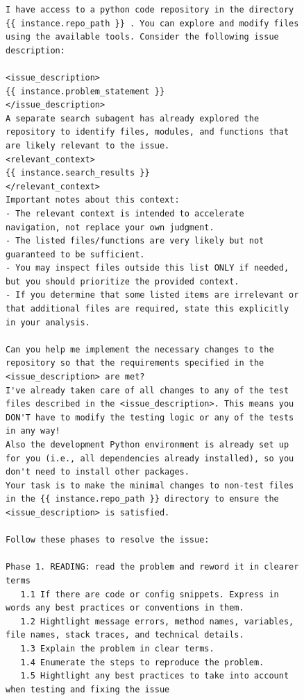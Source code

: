 \begin{figure}[!h]
    \centering
\begin{tcolorbox}[colback=blue!6!white, colframe=blue!45!white, title={\small User Prompt for OpenHands Issue Resolution Agent Augmented with Locations Retrieved by \methodname-14B (continued)}]
\begin{lstlisting}[basicstyle=\fontsize{7.7}{8}\ttfamily]
I have access to a python code repository in the directory {{ instance.repo_path }} . You can explore and modify files using the available tools. Consider the following issue description:

<issue_description>
{{ instance.problem_statement }}
</issue_description>
A separate search subagent has already explored the repository to identify files, modules, and functions that are likely relevant to the issue.
<relevant_context>
{{ instance.search_results }}
</relevant_context>
Important notes about this context:
- The relevant context is intended to accelerate navigation, not replace your own judgment.
- The listed files/functions are very likely but not guaranteed to be sufficient.
- You may inspect files outside this list ONLY if needed, but you should prioritize the provided context.
- If you determine that some listed items are irrelevant or that additional files are required, state this explicitly in your analysis.

Can you help me implement the necessary changes to the repository so that the requirements specified in the <issue_description> are met?
I've already taken care of all changes to any of the test files described in the <issue_description>. This means you DON'T have to modify the testing logic or any of the tests in any way!
Also the development Python environment is already set up for you (i.e., all dependencies already installed), so you don't need to install other packages.
Your task is to make the minimal changes to non-test files in the {{ instance.repo_path }} directory to ensure the <issue_description> is satisfied.

Follow these phases to resolve the issue:

Phase 1. READING: read the problem and reword it in clearer terms
   1.1 If there are code or config snippets. Express in words any best practices or conventions in them.
   1.2 Hightlight message errors, method names, variables, file names, stack traces, and technical details.
   1.3 Explain the problem in clear terms.
   1.4 Enumerate the steps to reproduce the problem.
   1.5 Hightlight any best practices to take into account when testing and fixing the issue


\end{lstlisting}
\end{tcolorbox}
\end{figure}
